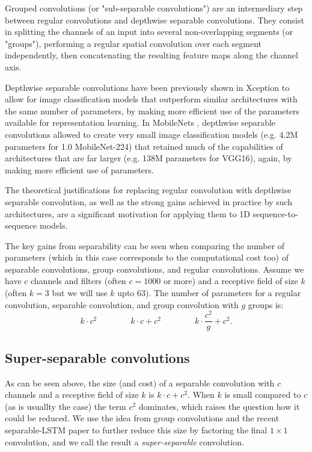 \documentclass{article}
\begin{document}
Grouped convolutions (or "sub-separable convolutions") are an intermediary step between regular convolutions and depthwise separable convolutions. They consist in splitting the channels of an input into several non-overlapping segments (or "groups"), performing a regular spatial convolution over each segment independently, then concatenating the resulting feature maps along the channel axis.

Depthwise separable convolutions have been previously shown in Xception \citep{xception2016} to allow for image classification models that outperform similar architectures with the same number of parameters, by making more efficient use of the parameters available for representation learning. In MobileNets \citep{mobilenets2017}, depthwise separable convolutions allowed to create very small image classification models (e.g. 4.2M parameters for 1.0 MobileNet-224) that retained much of the capabilities of architectures that are far larger (e.g. 138M parameters for VGG16), again, by making more efficient use of parameters.

The theoretical justifications for replacing regular convolution with depthwise separable convolution, as well as the strong gains achieved in practice by such architectures, are a significant motivation for applying them to 1D sequence-to-sequence models.

The key gains from separability can be seen when comparing the number of parameters (which in this case corresponds to the computational cost too) of separable convolutions, group convolutions, and regular convolutions. Assume we have $c$ channels and filters (often $c=1000$ or more) and a receptive field of size $k$ (often $k=3$ but we will use $k$ upto $63$). The number of parameters for a regular convolution, separable convolution, and group convolution with $g$ groups is:
\[ k \cdot c^2 \qquad \qquad k\cdot c + c^2 \qquad \qquad k \cdot \frac{c^2}{g} + c^2. \]

\subsection{Super-separable convolutions}

As can be seen above, the size (and cost) of a separable convolution with $c$ channels and a receptive field of size $k$ is $k\cdot c + c^2$.
When $k$ is small compared to $c$ (as is usuallty the case) the term $c^2$ dominates, which raises the question how it could be reduced.
We use the idea from group convolutions and the recent separable-LSTM paper \cite{factlstm} to further reduce this size by factoring the final $1 \times 1$ convolution, and we call the result a \emph{super-separable} convolution.
\end{document}
